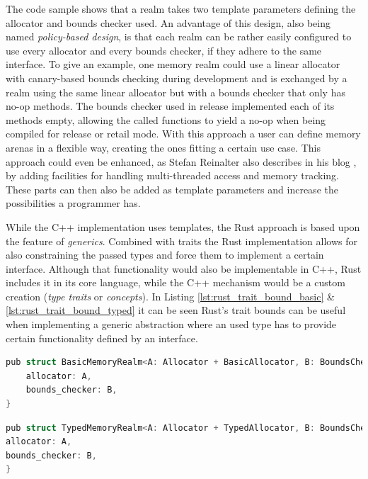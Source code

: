 \noindent
The code sample shows that a realm takes two template parameters defining the allocator and bounds checker used. An advantage of this design, also being named \textit{policy-based design}, is that each realm can be rather easily configured to use every allocator and every bounds checker, if they adhere to the same interface. To give an example, one memory realm could use a linear allocator with canary-based bounds checking during development and is exchanged by a realm using the same linear allocator but with a bounds checker that only has no-op methods. The bounds checker used in release implemented each of its methods empty, allowing the called functions to yield a no-op when being compiled for release or retail mode. With this approach a user can define memory arenas in a flexible way, creating the ones fitting a certain use case. This approach could even be enhanced, as Stefan Reinalter also describes in his blog \cite{MOL_MS_5}, by adding facilities for handling multi-threaded access and memory tracking. These parts can then also be added as template parameters and increase the possibilities a programmer has.

While the C++ implementation uses templates, the Rust approach is based upon the feature of \textit{generics}. Combined with traits the Rust implementation allows for also constraining the passed types and force them to implement a certain interface. Although that functionality would also be implementable in C++, Rust includes it in its core language, while the C++ mechanism would be a custom creation (\textit{type traits} or \textit{concepts}). In Listing \ref{lst:rust_trait_bound_basic} \& \ref{lst:rust_trait_bound_typed} it can be seen Rust's trait bounds can be useful when implementing a generic abstraction where an used type has to provide certain functionality defined by an interface.\\

\begin{lstlisting}[caption={Rust interface of the basic memory realm allowing only basic allocators.}, label={lst:rust_trait_bound_basic}, language={C++}]
pub struct BasicMemoryRealm<A: Allocator + BasicAllocator, B: BoundsChecker + Default> {
	allocator: A,
	bounds_checker: B,
}
\end{lstlisting}

\begin{lstlisting}[caption={Rust interface of the typed memory realm.}, label={lst:rust_trait_bound_typed}, language={C++}]
pub struct TypedMemoryRealm<A: Allocator + TypedAllocator, B: BoundsChecker + Default> {
allocator: A,
bounds_checker: B,
}
\end{lstlisting}

